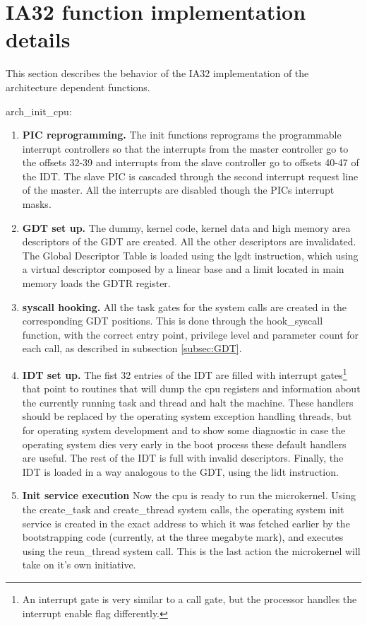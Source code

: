 \documentclass[11pt, letterpaper, twoside, english]{book}
\begin{document}
\section{IA32 function implementation details}

This section describes the behavior of the IA32 implementation of the architecture dependent functions.

\textsf{arch\_init\_cpu}: 
\begin{enumerate}
\item[]\textbf{PIC reprogramming.} The init functions reprograms the programmable interrupt controllers so that the interrupts from the master controller go to the offsets 32-39 and interrupts from the slave controller go to offsets 40-47 of the IDT. The slave PIC is cascaded through the second interrupt request line of the master. All the interrupts are disabled though the PICs interrupt masks.
\item[]\textbf{GDT set up.} The dummy, kernel code, kernel data and high memory area descriptors of the GDT are created. All the other descriptors are invalidated. The Global Descriptor Table is loaded using the \textsf{lgdt} instruction, which using a virtual descriptor composed by a linear base and a limit located in main memory loads the GDTR register.
\item[]\textbf{syscall hooking.} All the task gates for the system calls are created in the corresponding GDT positions. This is done through the \textsf{hook\_syscall} function, with the correct entry point, privilege level and parameter count for each call, as described in subsection \ref{subsec:GDT}.
\item[]\textbf{IDT set up.} The fist 32 entries of the IDT are filled with interrupt gates\footnote{An interrupt gate is very similar to a call gate, but the processor handles the interrupt enable flag differently.} that point to routines that will dump the cpu registers and information about the currently running task and thread and halt the machine. These handlers should be replaced by the operating system exception handling threads, but for operating system development and to show some diagnostic in case the operating system dies very early in the boot process these default handlers are useful. The rest of the IDT is full with invalid descriptors. Finally, the IDT is loaded in a way analogous to the GDT, using the \textsf{lidt} instruction.
\item[]\textbf{Init service execution} Now the cpu is ready to run the microkernel. Using the \textsf{create\_task} and \textsf{create\_thread} system calls, the operating system init service is created in the exact address to which it was fetched earlier by the bootstrapping code (currently, at the three megabyte mark), and executes using the \textsf{reun\_thread} system call. This is the last action the microkernel will take on it's own initiative.
\end{enumerate}
\end{document}
